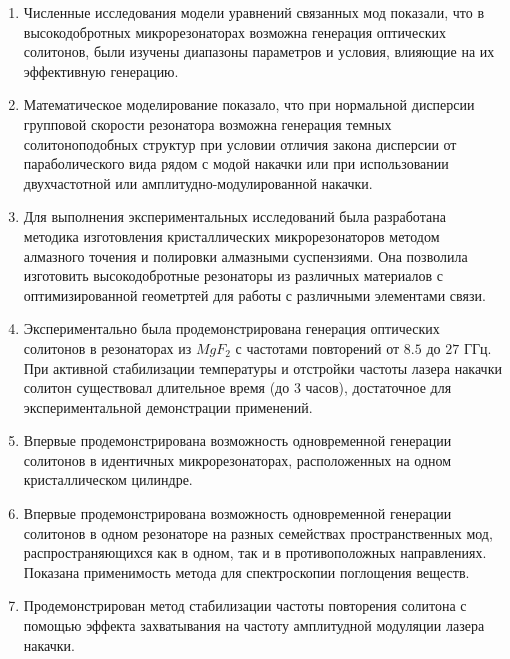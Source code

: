 \begin{enumerate}
  \item Численные исследования модели уравнений связанных мод показали, что в высокодобротных микрорезонаторах возможна генерация оптических солитонов, были изучены диапазоны параметров и условия, влияющие на их эффективную генерацию.
  \item Математическое моделирование показало, что при нормальной дисперсии групповой скорости резонатора возможна генерация темных солитоноподобных структур при условии отличия закона дисперсии от параболического вида рядом с модой накачки или при использовании двухчастотной или амплитудно-модулированной накачки.
  \item Для выполнения экспериментальных исследований была разработана методика изготовления кристаллических микрорезонаторов методом алмазного точения и полировки алмазными суспензиями. Она позволила изготовить высокодобротные резонаторы из различных материалов с оптимизированной геометртей для работы с различными элементами связи.
  \item Экспериментально была продемонстрирована генерация оптических солитонов в резонаторах из $MgF_2$ с частотами повторений от $8.5$ до $27$ ГГц. При активной стабилизации температуры и отстройки частоты лазера накачки солитон существовал длительное время (до 3 часов), достаточное для экспериментальной демонстрации применений.
  \item Впервые продемонстрирована возможность одновременной генерации солитонов в идентичных микрорезонаторах, расположенных на одном кристаллическом цилиндре.
  \item Впервые продемонстрирована возможность одновременной генерации солитонов в одном резонаторе на разных семействах пространственных мод, распространяющихся как в одном, так и в противоположных направлениях. Показана применимость метода для спектроскопии поглощения веществ.
  \item Продемонстрирован метод стабилизации частоты повторения солитона с помощью эффекта захватывания на частоту амплитудной модуляции лазера накачки.
\end{enumerate}
